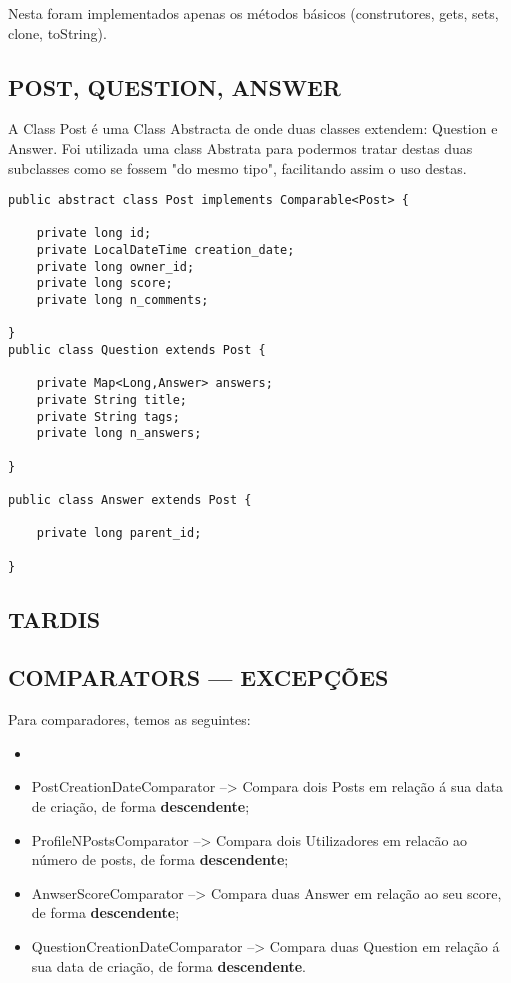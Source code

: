 \documentclass[letterpaper, 10 pt, conference]{IEEEtran}  %
\begin{document}
Nesta foram implementados apenas os métodos básicos (construtores, gets, sets, clone, toString).

\subsection{POST, QUESTION, ANSWER}

A Class Post é uma Class Abstracta de onde duas classes extendem: Question e Answer.
Foi utilizada uma class Abstrata para podermos tratar destas duas subclasses como se fossem
"do mesmo tipo", facilitando assim o uso destas.

\begin{lstlisting}
public abstract class Post implements Comparable<Post> {

    private long id;
    private LocalDateTime creation_date;
    private long owner_id;
    private long score;
    private long n_comments;

}
public class Question extends Post {

    private Map<Long,Answer> answers;
    private String title;
    private String tags;
    private long n_answers;

}

public class Answer extends Post {

    private long parent_id;

}
\end{lstlisting}

\subsection{TARDIS}

\subsection{COMPARATORS --- EXCEPÇÕES}

Para comparadores, temos as seguintes:
\begin{itemize}
    \item \item PostCreationDateComparator --> Compara dois Posts em relação á sua data de criação, de forma \textbf{descendente};
    \item ProfileNPostsComparator --> Compara dois Utilizadores em relacão ao número de posts, de forma \textbf{descendente};
    \item AnwserScoreComparator --> Compara duas Answer em relação ao seu score, de forma \textbf{descendente};
    \item QuestionCreationDateComparator --> Compara duas Question em relação á sua data de criação, de forma \textbf{descendente}.
\end{itemize}
\end{document}
